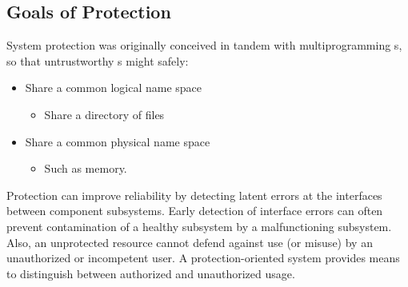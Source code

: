 \subsection{Goals of Protection}\label{subsec:Goals_of_Protection}
System protection was originally conceived in tandem with multiprogramming s, so that untrustworthy s might safely:
\begin{itemize}[noitemsep]
\item Share a common logical name space
  \begin{itemize}[noitemsep]
  \item Share a directory of files
  \end{itemize}
\item Share a common physical name space
  \begin{itemize}[noitemsep]
  \item Such as memory.
  \end{itemize}
\end{itemize}

Protection can improve reliability by detecting latent errors at the interfaces between component subsystems.
Early detection of interface errors can often prevent contamination of a healthy subsystem by a malfunctioning subsystem.
Also, an unprotected resource cannot defend against use (or misuse) by an unauthorized or incompetent user.
A protection-oriented system provides means to distinguish between authorized and unauthorized usage.


